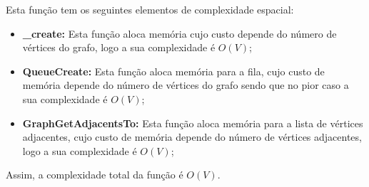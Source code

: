 Esta função tem os seguintes elementos de complexidade espacial:

\begin{itemize}
    \item \textbf{\_create:} Esta função aloca memória cujo custo depende do número de vértices do grafo, logo a sua complexidade é $O(V)$;
    \item \textbf{QueueCreate:} Esta função aloca memória para a fila, cujo custo de memória depende do número de vértices do grafo sendo que no pior caso a sua complexidade é $O(V)$;
    \item \textbf{GraphGetAdjacentsTo:} Esta função aloca memória para a lista de vértices adjacentes, cujo custo de memória depende do número de vértices adjacentes, logo a sua complexidade é $O(V)$;
\end{itemize}

Assim, a complexidade total da função é $O(V)$.